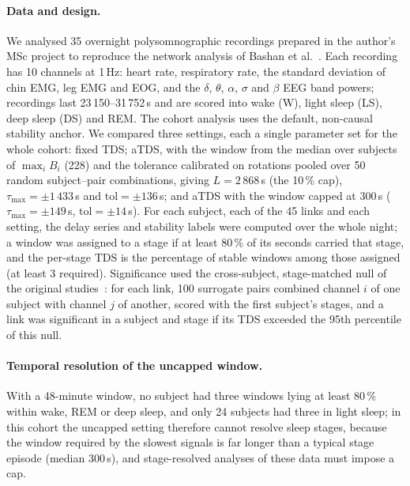 \documentclass[11pt,a4paper]{article}
\begin{document}
\paragraph{Data and design.} We analysed 35 overnight polysomnographic recordings prepared in the author's MSc project to reproduce the network analysis of Bashan et al.~\cite{Bashan2012NetworkPhysiology}. Each recording has 10 channels at 1\,Hz: heart rate, respiratory rate, the standard deviation of chin EMG, leg EMG and EOG, and the $\delta$, $\theta$, $\alpha$, $\sigma$ and $\beta$ EEG band powers; recordings last 23\,150--31\,752\,s and are scored into wake (W), light sleep (LS), deep sleep (DS) and REM. The cohort analysis uses the default, non-causal stability anchor. We compared three settings, each a single parameter set for the whole cohort: fixed TDS; aTDS, with the window from the median over subjects of $\max_i B_i$ (228) and the tolerance calibrated on rotations pooled over 50 random subject--pair combinations, giving $L = 2\,868$\,s (the 10\,\% cap), $\tau_{\max} = \pm1\,433$\,s and $\mathrm{tol} = \pm136$\,s; and aTDS with the window capped at 300\,s ($\tau_{\max} = \pm149$\,s, $\mathrm{tol} = \pm14$\,s). For each subject, each of the 45 links and each setting, the delay series and stability labels were computed over the whole night; a window was assigned to a stage if at least 80\,\% of its seconds carried that stage, and the per-stage TDS is the percentage of stable windows among those assigned (at least 3 required). Significance used the cross-subject, stage-matched null of the original studies~\cite{Bashan2012NetworkPhysiology}: for each link, 100 surrogate pairs combined channel $i$ of one subject with channel $j$ of another, scored with the first subject's stages, and a link was significant in a subject and stage if its TDS exceeded the 95th percentile of this null.

\paragraph{Temporal resolution of the uncapped window.} With a 48-minute window, no subject had three windows lying at least 80\,\% within wake, REM or deep sleep, and only 24 subjects had three in light sleep; in this cohort the uncapped setting therefore cannot resolve sleep stages, because the window required by the slowest signals is far longer than a typical stage episode (median 300\,s), and stage-resolved analyses of these data must impose a cap.
\end{document}

